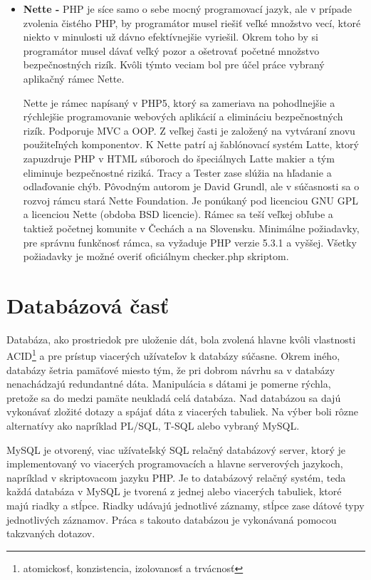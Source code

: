 \begin{itemize}
\item \textbf{Nette -} PHP je síce samo o sebe mocný programovací jazyk, ale v prípade zvolenia čistého PHP, by programátor musel riešiť veľké množstvo vecí, ktoré niekto v minulosti už dávno efektívnejšie vyriešil. Okrem toho by si programátor musel dávať veľký pozor a ošetrovať početné množstvo bezpečnostných rizík. Kvôli týmto veciam bol pre účel práce vybraný aplikačný rámec Nette.

Nette je rámec napísaný v PHP5, ktorý sa zameriava na pohodlnejšie a rýchlejšie programovanie webových aplikácií a elimináciu bezpečnostných rizík. Podporuje MVC a OOP. Z veľkej časti je založený na vytváraní znovu použiteľných komponentov. K Nette patrí aj šablónovací systém Latte, ktorý zapuzdruje PHP v HTML súboroch do špeciálnych Latte makier a tým eliminuje bezpečnostné riziká. Tracy a Tester zase slúžia na hľadanie a odlaďovanie chýb. Pôvodným autorom je David Grundl, ale v súčasnosti sa o rozvoj rámcu stará Nette Foundation. Je ponúkaný pod licenciou GNU GPL a licenciou Nette (obdoba BSD licencie). Rámec sa teší veľkej obľube a taktiež početnej komunite v Čechách a na Slovensku. Minimálne požiadavky, pre správnu funkčnosť rámca, sa vyžaduje PHP verzie 5.3.1 a vyššej. Všetky požiadavky je možné overiť oficiálnym checker.php skriptom. \cite{Grundl2009}

\end{itemize}

\section{Databázová časť}
\label{sec:databaza}
Databáza, ako prostriedok pre uloženie dát, bola zvolená hlavne kvôli vlastnosti ACID\footnote{atomickosť, konzistencia, izolovanosť a trvácnosť} a pre prístup viacerých užívateľov k databázy súčasne. Okrem iného, databázy šetria pamäťové miesto tým, že pri dobrom návrhu sa v databázy nenachádzajú redundantné dáta. Manipulácia s dátami je pomerne rýchla, pretože sa do medzi pamäte neukladá celá databáza. Nad databázou sa dajú vykonávať zložité dotazy a spájať dáta z viacerých tabuliek.  Na výber boli rôzne alternatívy ako napríklad PL/SQL, T-SQL alebo vybraný MySQL.   

MySQL je otvorený, viac užívateľský SQL relačný databázový server, ktorý je implementovaný vo viacerých programovacích a hlavne serverových jazykoch, napríklad v skriptovacom jazyku PHP. Je to databázový relačný systém, teda každá databáza v MySQL je tvorená z jednej alebo viacerých tabuliek, ktoré majú riadky a stĺpce. Riadky udávajú jednotlivé záznamy, stĺpce zase dátové typy jednotlivých záznamov. Práca s takouto databázou je vykonávaná pomocou takzvaných dotazov.


